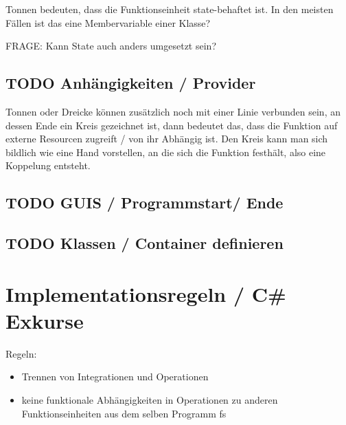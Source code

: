 \documentclass[11pt]{article}
\begin{document}
Tonnen bedeuten, dass die Funktionseinheit state-behaftet ist.
In den meisten Fällen ist das eine Membervariable einer Klasse?

FRAGE: Kann State auch anders umgesetzt sein?
\subsection{{\bfseries\sffamily TODO} Anhängigkeiten / Provider}
\label{sec:orgheadline14}
Tonnen oder Dreicke können zusätzlich noch mit einer Linie verbunden sein, an dessen Ende ein Kreis gezeichnet ist,
dann bedeutet das, dass die Funktion auf externe Resourcen zugreift / von ihr
Abhängig ist.
Den Kreis kann man sich bildlich wie eine Hand vorstellen, an die sich die
Funktion festhält, also eine Koppelung entsteht.


\subsection{{\bfseries\sffamily TODO} GUIS / Programmstart/ Ende}
\label{sec:orgheadline15}
\subsection{{\bfseries\sffamily TODO} Klassen / Container definieren}
\label{sec:orgheadline16}

\section{Implementationsregeln / C\# Exkurse}
\label{sec:orgheadline45}

Regeln:
\begin{itemize}
\item Trennen von Integrationen und Operationen
\item keine funktionale Abhängigkeiten in Operationen zu anderen Funktionseinheiten aus dem selben Programm
fs
\end{itemize}
\end{document}
